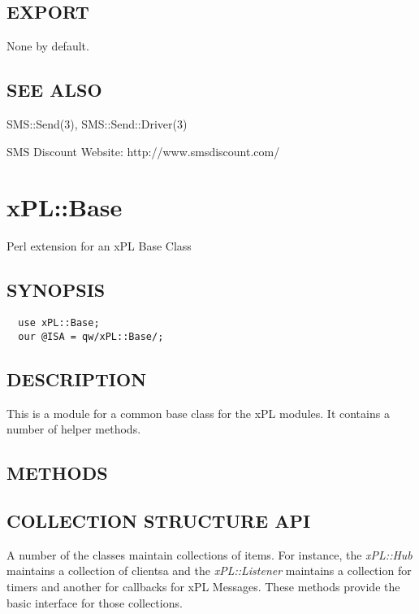 \documentclass[12pt,a4paper]{article}
\begin{document}
\subsection*{EXPORT\label{SMS::Send::SMSDiscount_EXPORT}}


None by default.

\subsection*{SEE ALSO\label{SMS::Send::SMSDiscount_SEE_ALSO}}


SMS::Send(3), SMS::Send::Driver(3)



SMS Discount Website: http://www.smsdiscount.com/

\newpage
\section{xPL::Base\label{xPL::Base}}


Perl extension for an xPL Base Class

\subsection*{SYNOPSIS\label{xPL::Base_SYNOPSIS}}
\begin{verbatim}
  use xPL::Base;
  our @ISA = qw/xPL::Base/;
\end{verbatim}
\subsection*{DESCRIPTION\label{xPL::Base_DESCRIPTION}}


This is a module for a common base class for the xPL modules.  It
contains a number of helper methods.

\subsection*{METHODS\label{xPL::Base_METHODS}}
\subsection*{COLLECTION STRUCTURE API\label{xPL::Base_COLLECTION_STRUCTURE_API}}


A number of the classes maintain collections of items.  For instance,
the \emph{xPL::Hub} maintains a collection of clientsa and the
\emph{xPL::Listener} maintains a collection for timers and another for
callbacks for xPL Messages.  These methods provide the basic interface
for those collections.
\end{document}
